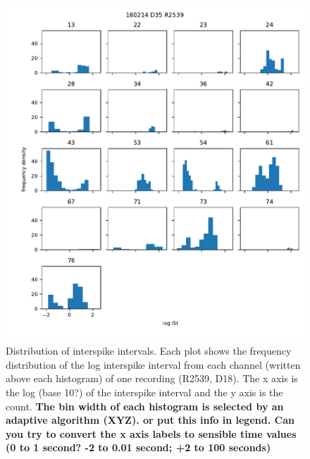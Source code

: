 \documentclass[doublespacing]{bmcart}
\begin{document}
\begin{backmatter}
\begin{figure}[h!]
  \includegraphics{../plots/logisi_plot44.pdf}
	\caption{Distribution of interspike intervals. Each plot shows the frequency distribution of the log interspike interval from each  channel (written above each histogram) of one recording (R2539, D18).  The x axis is the log (base 10?) of the interspike interval and the y axis is the count.  \textbf{The bin width of each histogram is selected by an adaptive algorithm (XYZ).  or put this info in legend.  Can you try to convert the x axis labels to sensible time values (0 to 1 second? -2 to 0.01 second; +2 to 100 seconds)}}
	\label{fig:logisi}
\end{figure}


\end{backmatter}
\end{document}
